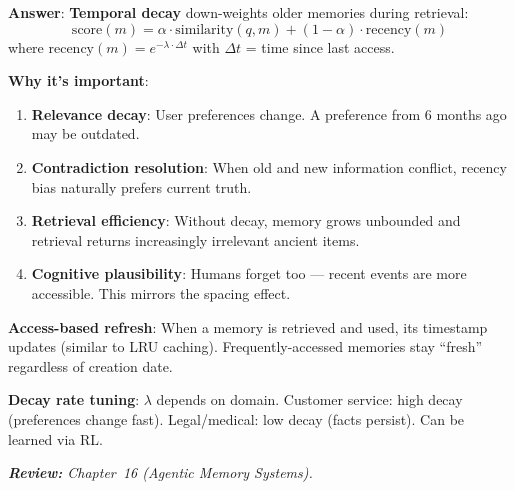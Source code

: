 \begin{questionbox}
\textbf{Answer}: \textbf{Temporal decay} down-weights older memories during retrieval: 
\[
\text{score}(m) = \alpha \cdot \text{similarity}(q, m) + (1 - \alpha) \cdot \text{recency}(m)
\]
 where $\text{recency}(m) = e^{-\lambda \cdot \Delta t}$ with $\Delta t$ = time since last access.

\textbf{Why it’s important}:

\begin{enumerate}
  \item \textbf{Relevance decay}: User preferences change. A preference from 6 months ago may be outdated.
  \item \textbf{Contradiction resolution}: When old and new information conflict, recency bias naturally prefers current truth.
  \item \textbf{Retrieval efficiency}: Without decay, memory grows unbounded and retrieval returns increasingly irrelevant ancient items.
  \item \textbf{Cognitive plausibility}: Humans forget too --- recent events are more accessible. This mirrors the spacing effect.
\end{enumerate}

\textbf{Access-based refresh}: When a memory is retrieved and used, its timestamp updates (similar to LRU caching). Frequently-accessed memories stay ``fresh'' regardless of creation date.

\textbf{Decay rate tuning}: $\lambda$ depends on domain. Customer service: high decay (preferences change fast). Legal/medical: low decay (facts persist). Can be learned via RL.

\emph{\textbf{Review:} Chapter~16 (Agentic Memory Systems).}
\end{questionbox}

